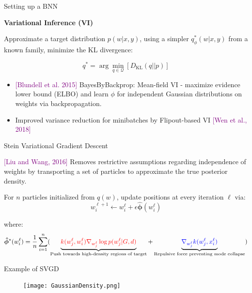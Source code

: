 \documentclass[usenames,dvipsnames,aspectratio=169]{beamer}
\theoremstyle{definition}
\begin{document}
\begin{frame}{Setting up a BNN}

    \textbf{Variational Inference (VI)}

    Approximate a target distribution $p(w | x, y)$, using a simpler $q^{\ast}_{\phi}(w | x, y)$ from a known family, minimize the KL divergence:

    $$q^{\ast} = \arg \min_{q \in \mathcal{Q}}[D_{\text{KL}}(q || p)]$$

    \begin{itemize}
        \item \textcolor{purple}{[Blundell et al. 2015]} BayesByBackprop: Mean-field VI - maximize evidence lower bound (ELBO) and learn $\phi$ for independent Gaussian distributions on weights via backpropagation.
        
        \item Improved variance reduction for minibatches by Flipout-based VI \textcolor{purple}{[Wen et al., 2018]}
    \end{itemize}    
\end{frame}
\begin{frame}{Stein Variational Gradient Descent}

    \textcolor{purple}{[Liu and Wang, 2016]} Removes restrictive assumptions regarding independence of weights by transporting a set of particles to approximate the true posterior density.

    For $n$ particles initialized from $q(w)$, update positions at every iteration $\ell$ via:
    $$w_i^{\ell+1} \leftarrow w_i^{\ell} + \epsilon \boldsymbol{\hat{\phi}}(w_i^{\ell})$$

    where:
    $$\boldsymbol{\hat{\phi}}^*(w_i^{\ell})=\frac{1}{n}\sum_{i=1}^n (\underbrace{\textcolor{red}{k(w_j^\ell,w_i^\ell)\nabla_{w_j^\ell}\log p(w_j^\ell | G, d)}}_{\text{Push towards high-density regions of target}}+\underbrace{\textcolor{blue}{\nabla_{w_j^\ell}k(w_j^\ell,x_i^\ell)}}_{\text{Repulsive force preventing mode collapse}})$$

\end{frame}

\begin{frame}{Example of SVGD}
    \begin{figure}[H]
        \centering
        \texttt{[image: GaussianDensity.png]}        
    \end{figure}
\end{frame}
\end{document}
